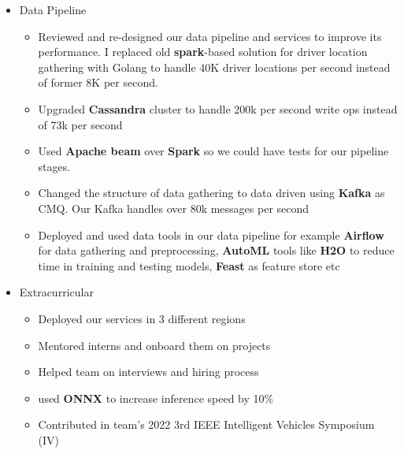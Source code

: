 {\begin{itemize}[label=\textbullet]
\begin{itemize}
                        \item Reduced short rides (rides that are finished under 10 minutes) \textbf{MAPE (mean absolute percentage error)} by 6\%.
                        \item Reduced total rides MAPE by 2\%.
                  \end{itemize}
            \item Data Pipeline
                  \begin{itemize}
                        \item Reviewed and re-designed our data pipeline and services to improve its performance.
                              I replaced old \textbf{spark}-based solution for driver location gathering with Golang to handle 40K driver
                              locations per second instead of former 8K per second.
                        \item Upgraded \textbf{Cassandra} cluster to handle 200k per second write ops instead of 73k per second
                        \item Used \textbf{Apache beam} over \textbf{Spark} so we could have tests for our pipeline stages.
                        \item Changed the structure of data gathering to data driven using \textbf{Kafka} as CMQ. Our Kafka handles over 80k messages per second
                        \item Deployed and used data tools in our data pipeline for example \textbf{Airflow} for data gathering and preprocessing, \textbf{AutoML} tools like \textbf{H2O} to reduce time in training and testing models, \textbf{Feast} as feature store etc
                  \end{itemize}
            \item Extracurricular
                  \begin{itemize}
                        \item Deployed our services in 3 different regions
                        \item Mentored interns and onboard them on projects
                        \item Helped team on interviews and hiring process
                        \item used \textbf{ONNX} to increase inference speed by 10\%
                        \item Contributed in team's 2022 3rd IEEE Intelligent Vehicles Symposium (IV)
                  \end{itemize}
      \end{itemize}
}

